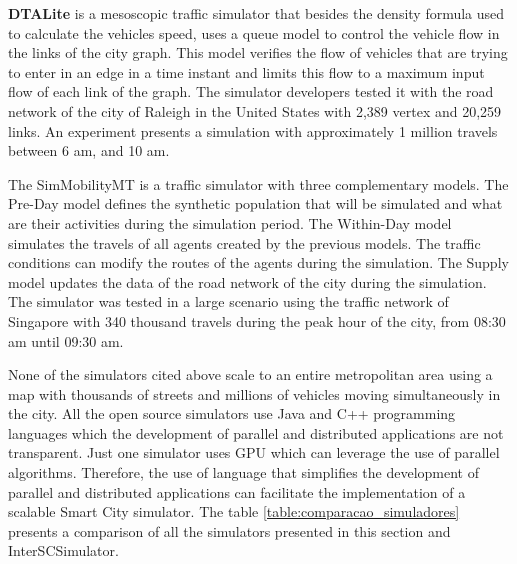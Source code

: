 \textbf{DTALite} \citep{zhou2014dtalite} is a mesoscopic traffic simulator that besides the density formula used to calculate the vehicles speed, uses a queue model to control the vehicle flow in the links of the city graph. This model verifies the flow of vehicles that are trying to enter in an edge in a time instant and limits this flow to a maximum input flow of each link of the graph. The simulator developers tested it with the road network of the city of Raleigh in the United States with 2,389 vertex and 20,259 links. An experiment presents a simulation with approximately 1 million travels between 6 am, and 10 am.

The SimMobilityMT is a traffic simulator with three complementary models. The Pre-Day model defines the synthetic population that will be simulated and what are their activities during the simulation period. The Within-Day model simulates the travels of all agents created by the previous models. The traffic conditions can modify the routes of the agents during the simulation. The Supply model updates the data of the road network of the city during the simulation. The simulator was tested in a large scenario using the traffic network of Singapore with 340 thousand travels during the peak hour of the city, from 08:30 am until 09:30 am.

None of the simulators cited above scale to an entire metropolitan area using a map with thousands of streets and millions of vehicles moving simultaneously in the city. All the open source simulators use Java and C++  programming languages which the development of parallel and distributed applications are not transparent. Just one simulator \citep{song2017gpusimulation} uses GPU which can leverage the use of parallel algorithms. Therefore, the use of language that simplifies the development of parallel and distributed applications can facilitate the implementation of a scalable Smart City simulator. The table \ref{table:comparacao_simuladores} presents a comparison of all the simulators presented in this section and InterSCSimulator.

